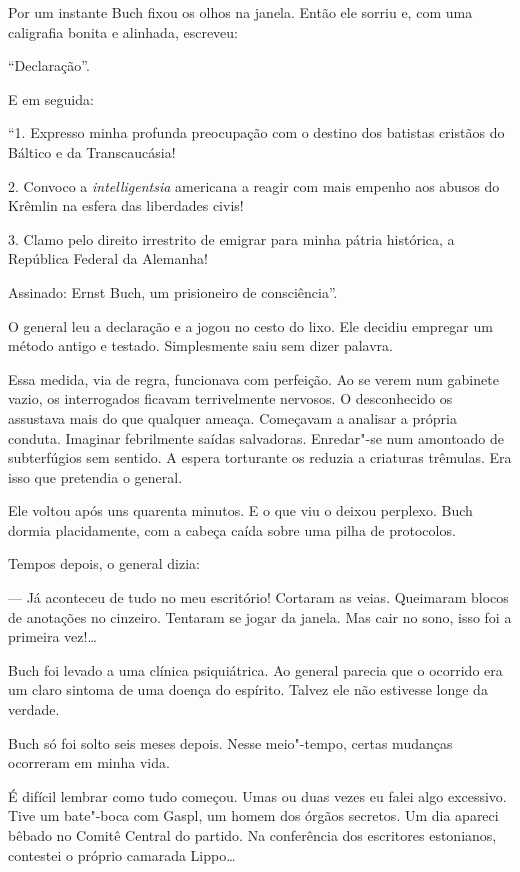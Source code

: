 Por um instante Buch fixou os olhos na janela. Então ele sorriu e, com
uma caligrafia bonita e alinhada, escreveu:

``Declaração''.

E em seguida:

``1. Expresso minha profunda preocupação com o destino dos batistas
cristãos do Báltico e da Transcaucásia!

2. Convoco a \emph{intelligentsia} americana a reagir com mais empenho
aos abusos do Krêmlin na esfera das liberdades civis!

3. Clamo pelo direito irrestrito de emigrar para minha pátria histórica,
a República Federal da Alemanha!

Assinado: Ernst Buch, um prisioneiro de consciência''.

O general leu a declaração e a jogou no cesto do lixo. Ele decidiu
empregar um método antigo e testado. Simplesmente saiu sem dizer
palavra.

Essa medida, via de regra, funcionava com perfeição. Ao se verem num
gabinete vazio, os interrogados ficavam terrivelmente nervosos. O
desconhecido os assustava mais do que qualquer ameaça. Começavam a
analisar a própria conduta. Imaginar febrilmente saídas salvadoras.
Enredar"-se num amontoado de subterfúgios sem sentido. A espera
torturante os reduzia a criaturas trêmulas. Era isso que pretendia o
general.

Ele voltou após uns quarenta minutos. E o que viu o deixou perplexo.
Buch dormia placidamente, com a cabeça caída sobre uma pilha de
protocolos.

Tempos depois, o general dizia:

--- Já aconteceu de tudo no meu escritório! Cortaram as veias. Queimaram
blocos de anotações no cinzeiro. Tentaram se jogar da janela. Mas cair
no sono, isso foi a primeira vez!\ldots{}

Buch foi levado a uma clínica psiquiátrica. Ao general parecia que o
ocorrido era um claro sintoma de uma doença do espírito. Talvez ele não
estivesse longe da verdade.

Buch só foi solto seis meses depois. Nesse meio"-tempo, certas mudanças
ocorreram em minha vida.

É difícil lembrar como tudo começou. Umas ou duas vezes eu falei algo
excessivo. Tive um bate"-boca com Gaspl, um homem dos órgãos secretos. Um
dia apareci bêbado no Comitê Central do partido. Na conferência dos
escritores estonianos, contestei o próprio camarada Lippo\ldots{}

